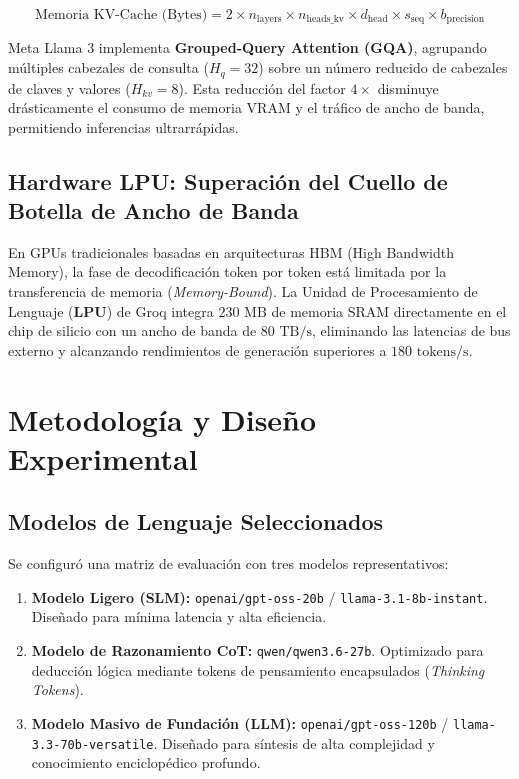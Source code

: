 \documentclass[12pt,letterpaper]{article}
\begin{document}
\begin{equation}
\text{Memoria KV-Cache (Bytes)} = 2 \times n_{\text{layers}} \times n_{\text{heads\_kv}} \times d_{\text{head}} \times s_{\text{seq}} \times b_{\text{precision}}
\end{equation}

Meta Llama 3 implementa \textbf{Grouped-Query Attention (GQA)}, agrupando múltiples cabezales de consulta ($H_q = 32$) sobre un número reducido de cabezales de claves y valores ($H_{kv} = 8$). Esta reducción del factor $4\times$ disminuye drásticamente el consumo de memoria VRAM y el tráfico de ancho de banda, permitiendo inferencias ultrarrápidas.

\subsection{Hardware LPU: Superación del Cuello de Botella de Ancho de Banda}
En GPUs tradicionales basadas en arquitecturas HBM (High Bandwidth Memory), la fase de decodificación token por token está limitada por la transferencia de memoria (\textit{Memory-Bound}). La Unidad de Procesamiento de Lenguaje (\textbf{LPU}) de Groq integra $230\text{ MB}$ de memoria SRAM directamente en el chip de silicio con un ancho de banda de $80\text{ TB/s}$, eliminando las latencias de bus externo y alcanzando rendimientos de generación superiores a $180\text{ tokens/s}$.

\section{Metodología y Diseño Experimental}

\subsection{Modelos de Lenguaje Seleccionados}
Se configuró una matriz de evaluación con tres modelos representativos:
\begin{enumerate}
    \item \textbf{Modelo Ligero (SLM):} \texttt{openai/gpt-oss-20b} / \texttt{llama-3.1-8b-instant}. Diseñado para mínima latencia y alta eficiencia.
    \item \textbf{Modelo de Razonamiento CoT:} \texttt{qwen/qwen3.6-27b}. Optimizado para deducción lógica mediante tokens de pensamiento encapsulados (\textit{Thinking Tokens}).
    \item \textbf{Modelo Masivo de Fundación (LLM):} \texttt{openai/gpt-oss-120b} / \texttt{llama-3.3-70b-versatile}. Diseñado para síntesis de alta complejidad y conocimiento enciclopédico profundo.
\end{enumerate}
\end{document}
